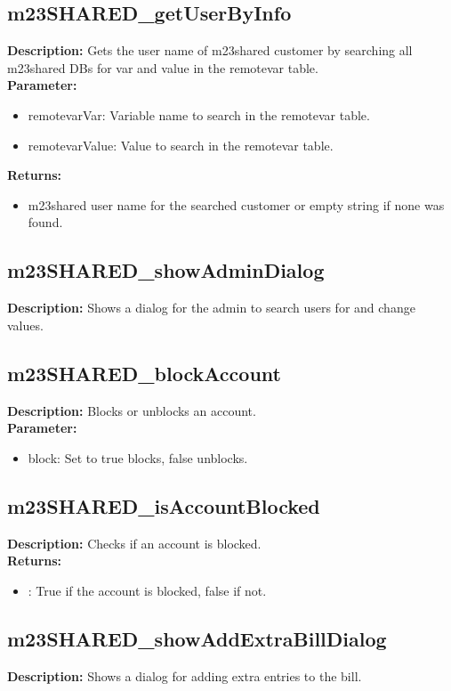 \subsection{m23SHARED\_getUserByInfo}
\textbf{Description:} Gets the user name of m23shared customer by searching all m23shared DBs for var and value in the remotevar table.\\
\textbf{Parameter:}
\begin{itemize}
\item remotevarVar: Variable name to search in the remotevar table.
\item remotevarValue: Value to search in the remotevar table.
\end{itemize}
\textbf{Returns:}
\begin{itemize}
\item m23shared user name for the searched customer or empty string if none was found.
\end{itemize}

\subsection{m23SHARED\_showAdminDialog}
\textbf{Description:} Shows a dialog for the admin to search users for and change values.\\

\subsection{m23SHARED\_blockAccount}
\textbf{Description:} Blocks or unblocks an account.\\
\textbf{Parameter:}
\begin{itemize}
\item block: Set to true blocks, false unblocks.
\end{itemize}

\subsection{m23SHARED\_isAccountBlocked}
\textbf{Description:} Checks if an account is blocked.\\
\textbf{Returns:}
\begin{itemize}
\item : True if the account is blocked, false if not.
\end{itemize}

\subsection{m23SHARED\_showAddExtraBillDialog}
\textbf{Description:} Shows a dialog for adding extra entries to the bill.\\

